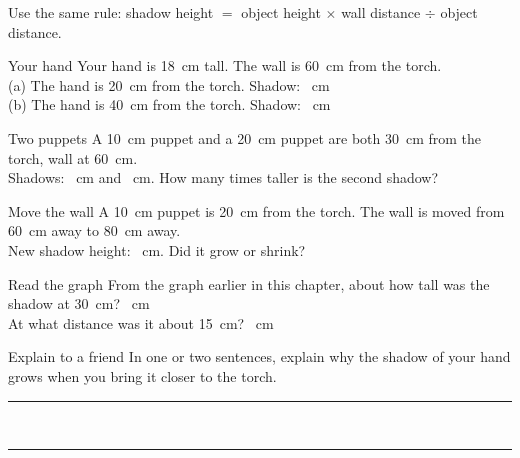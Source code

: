 Use the same rule: shadow height $=$ object height $\times$ wall distance $\div$ object distance.

\begin{puzzle}{Your hand}
Your hand is 18~cm tall. The wall is 60~cm from the torch.\\
(a) The hand is 20~cm from the torch. Shadow: \wline[1.6cm]~cm\\
(b) The hand is 40~cm from the torch. Shadow: \wline[1.6cm]~cm
\end{puzzle}

\begin{puzzle}{Two puppets}
A 10~cm puppet and a 20~cm puppet are both 30~cm from the torch, wall at 60~cm.\\
Shadows: \wline[1.6cm]~cm and \wline[1.6cm]~cm. How many times taller is the second shadow? \wline[1.6cm]
\end{puzzle}

\begin{puzzle}{Move the wall}
A 10~cm puppet is 20~cm from the torch. The wall is moved from 60~cm away to 80~cm away.\\
New shadow height: \wline[1.6cm]~cm. Did it grow or shrink? \wline[2cm]
\end{puzzle}

\begin{puzzle}{Read the graph}
From the graph earlier in this chapter, about how tall was the shadow at 30~cm? \wline[1.6cm]~cm\\
At what distance was it about 15~cm? \wline[1.6cm]~cm
\end{puzzle}

\begin{puzzle}{Explain to a friend}
In one or two sentences, explain why the shadow of your hand grows when you bring it closer to the torch.\\
\rule{\linewidth}{0.5pt}\\[4pt]\rule{\linewidth}{0.5pt}
\end{puzzle}
\clearpage
